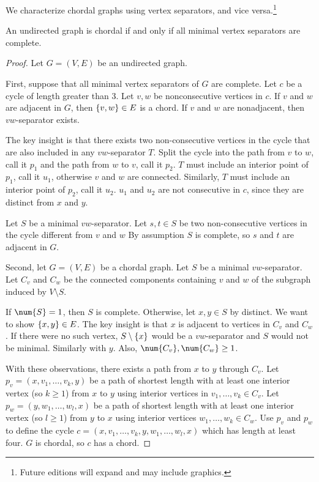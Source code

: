 

We characterize chordal graphs using vertex separators, and vice versa.\footnote{Future editions will expand and may include graphics.}


\begin{proposition}

An undirected graph is chordal if and only if all minimal vertex separators are complete.

\begin{proof}
Let $G = (V, E)$ be an undirected graph.

First, suppose that all minimal vertex separators of $G$ are complete.
Let $c$ be a cycle of length greater than 3.
Let $v, w$ be nonconsecutive vertices in $c$.
If $v$ and $w$ are adjacent in $G$, then $\{v, w\} \in E$ is a chord.
If $v$ and $w$ are nonadjacent, then  $vw$-separator exists.

The key insight is that there exists two non-consecutive vertices in the cycle that are also included in any $vw$-separator $T$.
Split the cycle into the path from $v$ to $w$, call it $p_1$ and the path from $w$ to $v$, call it $p_2$.
$T$ must include an interior point of $p_1$, call it $u_1$, otherwise $v$ and $w$ are connected.
Similarly, $T$ must include an interior point of $p_2$, call it $u_2$.
$u_1$ and $u_2$ are not consecutive in $c$, since they are distinct from $x$ and $y$.

Let $S$ be a minimal $vw$-separator.
Let $s, t \in S$ be two non-consecutive vertices in the cycle different from $v$ and $w$
By assumption $S$ is complete, so $s$ and $t$ are adjacent in $G$.

Second, let $G = (V, E)$ be a chordal graph.
Let $S$ be a minimal $vw$-separator.
Let $C_v$ and $C_w$ be the connected components containing $v$ and $w$ of the subgraph induced by $V \setminus S$.

If $\num{S} = 1$, then $S$ is complete.
Otherwise, let $x, y \in S$ by distinct.
We want to show $\{x, y\} \in E$.
The key insight is that $x$ is adjacent to vertices in $C_v$ and $C_w$.
If there were no such vertex, $S \setminus \{x\}$ would be a $vw$-separator and $S$ would not be minimal.
Similarly with $y$.
Also, $\num{C_v}, \num{C_w} \geq 1$.

With these observations, there exists a path from $x$ to $y$ through $C_v$.
Let $p_v = (x, v_1, \dots, v_k, y)$ be a path of shortest length with at least one interior vertex (so $k \geq 1$) from $x$ to $y$ using interior vertices in $v_1, \dots, v_k \in C_v$.
Let $p_w = (y, w_1, \dots, w_l, x)$ be a path of shortest length with at least one interior vertex (so $l \geq 1$) from $y$ to $x$ using interior vertices $w_1, \dots, w_k \in C_w$.
Use $p_v$ and $p_w$ to define the cycle $c = (x, v_1, \dots, v_k, y, w_1, \dots, w_l, x)$ which has length at least four.
$G$ is chordal, so $c$ has a chord.


\end{proof}
\end{proposition}
